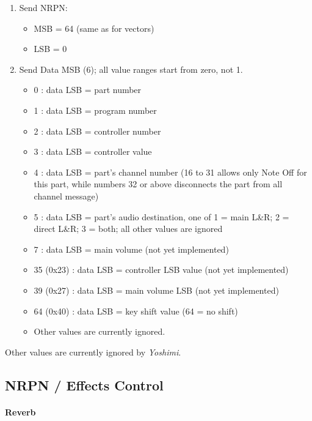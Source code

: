    \begin{enumerate}
      \item Send NRPN:
      \begin{itemize}
         \item MSB = 64 (same as for vectors)
         \item LSB = 0
      \end{itemize}
      \item Send Data MSB (6); all value ranges start from zero, not 1.
      \begin{itemize}
         \item 0 : data LSB = part number
         \item 1 : data LSB = program number
         \item 2 : data LSB = controller number
         \item 3 : data LSB = controller value
         \item 4 : data LSB = part's channel number (16 to 31 allows only
            Note Off for this part, while numbers 32 or above disconnects
            the part from all channel message)
         \item 5 : data LSB = part's audio destination, one of
                    1 = main L\&R;
                    2 = direct L\&R;
                    3 = both;
                    all other values are ignored
         \item 7 : data LSB = main volume (not yet implemented)
         \item 35 (0x23) : data LSB = controller LSB value (not yet implemented)
         \item 39 (0x27) : data LSB = main volume LSB (not yet implemented)
         \item 64 (0x40) : data LSB = key shift value (64 = no shift)
         \item Other values are currently ignored.
      \end{itemize}
   \end{enumerate}

   Other values are currently ignored by \textsl{Yoshimi}.

\subsection{NRPN / Effects Control}
\label{subsection:nrpns_midi_nrpn_effects_control}

\paragraph{Reverb}

